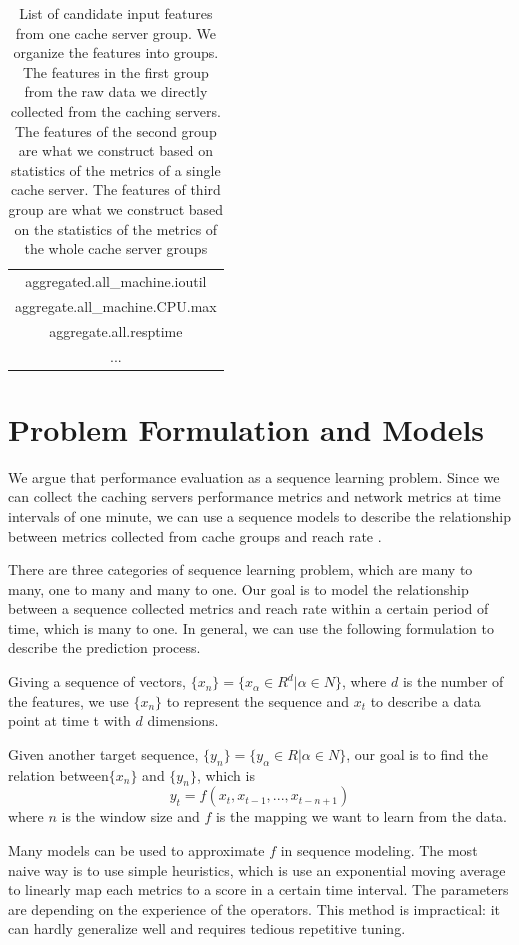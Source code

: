 \documentclass[5p]{elsarticle}
\newcommand{\dabiaolv}{reach rate }
\begin{document}
\begin{table}[]
\begin{tabular}{|c|}
aggregated.all\_machine.ioutil\\
aggregate.all\_machine.CPU.max\\
aggregate.all.resptime\\
...\\
\hline
\end{tabular}
\caption{List of candidate input features from one cache server group. We organize the features into groups. The features in the first group from the raw data we directly collected from the caching servers. The features of the second group are what we construct based on statistics of the metrics of a single cache server. The features of third group are what we construct based on the statistics of the metrics of the whole cache server groups}
\label{feature_list}
\end{table}

\section{Problem Formulation and Models}
We argue that performance evaluation as a sequence learning problem. Since we can collect the caching servers performance metrics and network metrics at time intervals of one minute, we can use a sequence models to describe the relationship between metrics collected from cache groups and \dabiaolv.

There are three categories of sequence learning problem, which are many to many, one to many and many to one. Our goal is to model the relationship between a sequence collected metrics and \dabiaolv within a certain period of time, which is many to one. In general, we can use the following formulation to describe the prediction process.

Giving a sequence of vectors, $\{x_n\}=\{x_{\alpha} \in R^{d}|\alpha \in N\}$, where $d$ is the number of the features, we use $\{x_n\}$ to represent the sequence and $x_t$ to describe a data point at time t with $d$ dimensions.

Given another target sequence, $\{y_n\}=\{y_{\alpha} \in R|\alpha \in N\}$, our goal is to find the relation between$\{x_n\}$ and $\{y_n\}$, which is 
$$y_t=f(x_{t},x_{t-1},...,x_{t-n+1})$$
where $n$ is the window size and $f$ is the mapping we want to learn from the data.

Many models can be used to approximate $f$ in sequence modeling. The most naive way is to use simple heuristics, which is use an exponential moving average to linearly map each metrics to a score in a certain time interval. The parameters are depending on the experience of the operators. This method is impractical: it can hardly generalize well and requires tedious repetitive tuning.
\end{document}

